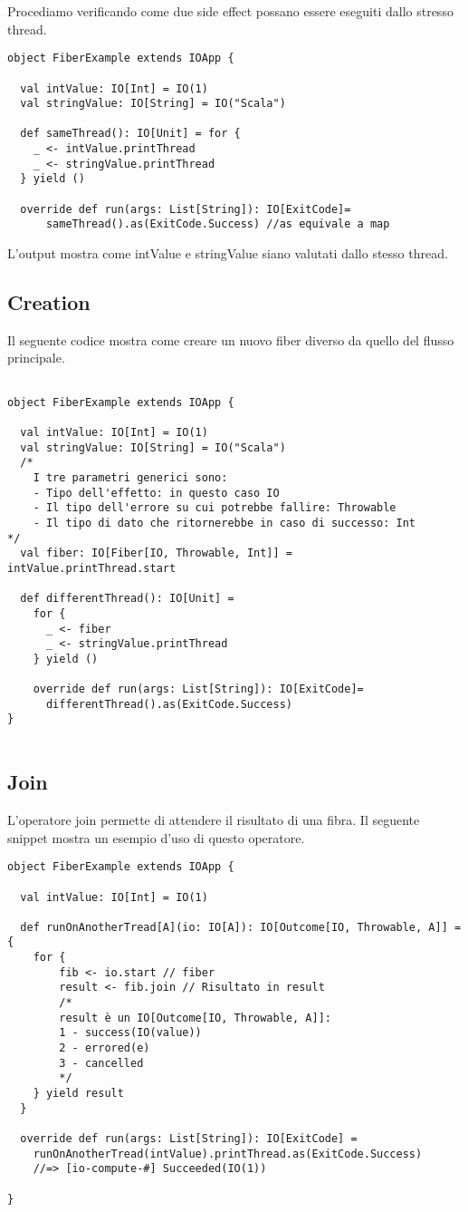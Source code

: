Procediamo verificando come due side effect possano essere eseguiti dallo stresso thread. 
\begin{verbatim}
object FiberExample extends IOApp {

  val intValue: IO[Int] = IO(1)
  val stringValue: IO[String] = IO("Scala")

  def sameThread(): IO[Unit] = for {
    _ <- intValue.printThread
    _ <- stringValue.printThread
  } yield ()

  override def run(args: List[String]): IO[ExitCode]=
      sameThread().as(ExitCode.Success) //as equivale a map
\end{verbatim}

L'output mostra come intValue e stringValue siano valutati dallo stesso thread.

\subsection{Creation}
Il seguente codice mostra come creare un nuovo fiber diverso da quello del flusso principale.

\begin{verbatim}

object FiberExample extends IOApp {

  val intValue: IO[Int] = IO(1)
  val stringValue: IO[String] = IO("Scala")
  /*
    I tre parametri generici sono:
    - Tipo dell'effetto: in questo caso IO
    - Il tipo dell'errore su cui potrebbe fallire: Throwable
    - Il tipo di dato che ritornerebbe in caso di successo: Int
*/
  val fiber: IO[Fiber[IO, Throwable, Int]] = intValue.printThread.start

  def differentThread(): IO[Unit] =
    for {
      _ <- fiber
      _ <- stringValue.printThread
    } yield ()

    override def run(args: List[String]): IO[ExitCode]=
      differentThread().as(ExitCode.Success) 
}
    
\end{verbatim}

\subsection{Join}
L'operatore join permette di attendere il risultato di una fibra. Il seguente snippet mostra un esempio d'uso di questo operatore.

\begin{verbatim}
object FiberExample extends IOApp {

  val intValue: IO[Int] = IO(1)
  
  def runOnAnotherTread[A](io: IO[A]): IO[Outcome[IO, Throwable, A]] = {
    for {
        fib <- io.start // fiber
        result <- fib.join // Risultato in result
        /*
        result è un IO[Outcome[IO, Throwable, A]]:
        1 - success(IO(value))
        2 - errored(e)
        3 - cancelled
        */
    } yield result
  }

  override def run(args: List[String]): IO[ExitCode] = 
    runOnAnotherTread(intValue).printThread.as(ExitCode.Success) 
    //=> [io-compute-#] Succeeded(IO(1))
    
}
\end{verbatim}

